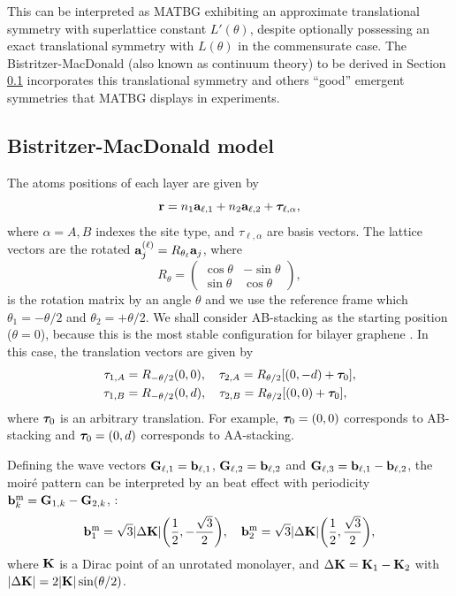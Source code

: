 \documentclass[12pt]{report}
\begin{document}
This can be interpreted as MATBG exhibiting an approximate translational symmetry with superlattice constant $L'(\theta)$, despite optionally possessing an exact translational symmetry with $L(\theta)$ in the commensurate case. The Bistritzer-MacDonald (also known as continuum theory) to be derived in Section \ref{sec:BM-model} incorporates this translational symmetry and others ``good'' emergent symmetries that MATBG displays in experiments.


\subsection{Bistritzer-MacDonald model} \label{sec:BM-model}

The atoms positions of each layer are given by
\begin{equation} \label{eq:position-atoms-tbg}
{\vb{r}} = n_1 \vb{a}_{\ell,1} + n_2 \vb{a}_{\ell,2} + {\bm{\tau}}_{\ell,\alpha},
\end{equation}
where $\alpha = A,B$ indexes the site type, and $\tau_{\ell,\alpha}$ are basis vectors. The lattice vectors are the rotated $\vb{a}_{j}^{(\ell)} = R_{\theta_\ell} \vb{a}_{j}$, where
\begin{equation} \label{eq:rotation-matrix}
R_\theta =
\begin{pmatrix}
\cos\theta & -\sin\theta \\
\sin\theta & \cos\theta
\end{pmatrix},
\end{equation}
is the rotation matrix by an angle $\theta$ and we use the reference frame which $\theta_1 = -\theta/2$ and $\theta_2 = +\theta/2$. We shall consider AB-stacking as the starting position ($\theta=0$), because this is the most stable configuration for bilayer graphene \cite{handbook2019}. In this case, the translation vectors are given by
\begin{align}
\tau_{1,A} &= R_{-\theta/2}(0,0), \quad \tau_{2,A} = R_{\theta/2} [(0,-d) + {\bm{\tau}}_0], \label{eq:tauA} \\
\tau_{1,B} &= R_{-\theta/2}(0,d), \quad \tau_{2,B} = R_{\theta/2} [(0,0) + {\bm{\tau}}_0], \label{eq:tauB}
\end{align}
where ${\bm{\tau}}_0$ is an arbitrary translation. For example, ${\bm{\tau}}_0 = (0,0)$ corresponds to AB-stacking and ${\bm{\tau}}_0 = (0, d)$ corresponds to AA-stacking.

Defining the wave vectors $\vb{G}_{\ell,1} = \vb{b}_{\ell,1}$, $\vb{G}_{\ell,2} = \vb{b}_{\ell,2}$ and $\vb{G}_{\ell,3} = \vb{b}_{\ell,1} - \vb{b}_{\ell,2}$, the moiré pattern can be interpreted by an beat effect with periodicity $\vb{b}_k^{\text{m}} = \vb{G}_{1,k} - \vb{G}_{2,k}$, \cite{handbook2019}:
\begin{equation} \label{eq:moire-bvecs}
\vb{b}_1^{\text{m}} = \sqrt{3} \abs{\Delta \vb{K}} \qty( \frac{1}{2}, -\frac{\sqrt{3}}{2}), \quad
\vb{b}_2^{\text{m}} = \sqrt{3} \abs{\Delta \vb{K}} \qty( \frac{1}{2},  \frac{\sqrt{3}}{2}),
\end{equation}
where $\vb{K}$ is a Dirac point of an unrotated monolayer, and $\Delta\vb{K} = \vb{K}_1-\vb{K}_2$ with $\abs{\Delta \vb{K}} = 2 \abs{\vb{K}} \sin(\theta/2)$.
\end{document}
